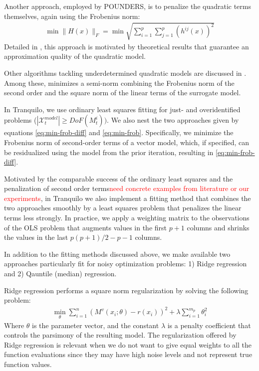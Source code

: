 Another approach, employed by POUNDERS, is to penalize the quadratic terms themselves, again using the Frobenius norm:
\begin{align}
\min\lVert H(x)\rVert_F =\min\sqrt{\sum\limits_{i=1}^p\sum\limits_{j=1}^{p}(h^{ij}(x))^2}
\label{eq:min-frob}
\end{align}
Detailed in \cite{Wild2008}, this approach is motivated by theoretical results that guarantee an approximation quality of the quadratic model.

Other algorithms tackling underdetermined quadratic models are discussed in \cite{Larson2019}. Among these, \cite{Powell2012} minimizes a semi-norm combining the Frobenius norm of the second order and the square norm of the linear terms of the surrogate model.

In Tranquilo, we use ordinary least squares fitting for just- and overidentified problems ($|\mathcal{X}_t^{model}|\geq DoF(M_t^{i}))$. We also nest the two approaches given by equations \ref{eq:min-frob-diff} and \ref{eq:min-frob}. Specifically, we minimize the Frobenius norm of second-order terms of a vector model, which, if specified, can be residualized using the model from the prior iteration, resulting in \ref{eq:min-frob-diff}.

Motivated by the comparable success of the ordinary least squares and the penalization of second order terms\textcolor{red}{need concrete examples from literature or our experiments}, in Tranquilo we also implement a fitting method that combines the two approaches smoothly by a least squares problem that penalizes the linear terms less strongly. In practice, we apply a weighting matrix to the observations of the OLS problem that augments values in the first $p+1$ columns and shrinks the values in the last $p(p+1)/2-p-1$ columns.

In addition to the fitting methods discussed above, we make available two approaches particularly fit for noisy optimization problems: 1) Ridge regression and 2) Qauntile (median) regression.

Ridge regression performs a square norm regularization by solving the following problem:
\begin{align}
    \min\limits_{\theta}\sum\limits_{i=1}^{n}(M^v(x_i;\theta)-r(x_i))^2+\lambda\sum\limits_{i=1}^{m_p}\theta_i^2
    \label{eq:fit-ridge}
\end{align}
Where $\theta$ is the parameter vector, and the constant $\lambda$ is a penalty coefficient that controls the parsimony of the resulting model. The regularization offered by Ridge regression is relevant when we do not want to give equal weights to all the function evaluations since they may have high noise levels and not represent true function values.

